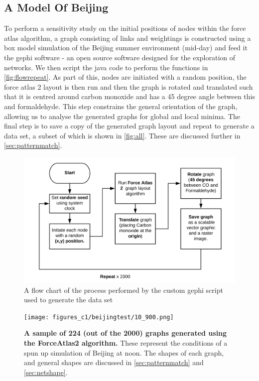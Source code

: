 \subsection{A Model Of Beijing}
To perform a sensitivity study on the initial positions of nodes within the force atlas algorithm, a graph consisting of links and weightings is constructed using a box model simulation of the Beijing summer environment (mid-day) and feed it the gephi software \citep{gephi} - an open source software designed for the exploration of networks. We then script the java code to perform the functions in \autoref{fig:flowrepeat}. As part of this, nodes are initiated with a random position, the force atlas 2 layout is then run and then the graph is rotated and translated such that it is centred around carbon monoxide and has a 45 degree angle between this and formaldehyde. This step constrains the general orientation of the graph, allowing us to analyse the generated graphs for global and local minima. The final step is to save a copy of the generated graph layout and repeat to generate a data set, a subset of which is shown in  \autoref{fig:all}. These are discussed further in \autoref{sec:patternmatch}.

    \begin{figure}[H]
         \centering
     \includegraphics[width=\textwidth]{figures_c1/flowrepeat.png}
     \caption{ A flow chart of the process performed by the custom gephi script used to generate the data set}
     \label{fig:flowrepeat}
     \end{figure}
 
    \begin{figure}[H]
         \centering
     \texttt{[image: figures\_c1/beijingtest/10\_900.png]}
     \caption{\textbf{A sample of 224 (out of the 2000) graphs generated using the ForceAtlas2 algorithm.} These represent the conditions of a spun up simulation of Beijing at noon. The shapes of each graph, and general shapes are discussed in \autoref{sec:patternmatch} and \autoref{sec:netshape}.}
     \label{fig:all}
     \end{figure}
 

